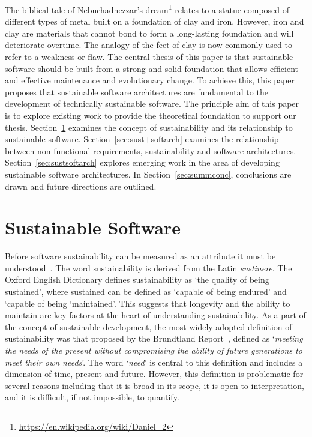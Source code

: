 \documentclass[preprint,12pt,authoryear]{elsarticle}
\begin{document}
The biblical tale of Nebuchadnezzar's
dream\footnote{\url{https://en.wikipedia.org/wiki/Daniel_2}} relates
to a statue composed of different types of metal built on a foundation
of clay and iron. However, iron and clay are materials that cannot
bond to form a long-lasting foundation and will deteriorate
overtime. The analogy of the feet of clay is now commonly used to
refer to a weakness or flaw. The central thesis of this paper is that
sustainable software should be built from a strong and solid
foundation that allows efficient and effective maintenance and
evolutionary change. To achieve this, this paper proposes that
sustainable software architectures are fundamental to the development
of technically sustainable software. The principle aim of this paper
is to explore existing work to provide the theoretical foundation to
support our thesis. Section~\ref{sec:sussoft} examines the concept of
sustainability and its relationship to sustainable
software. Section~\ref{sec:sust+softarch} examines the relationship
between non-functional requirements, sustainability and software
architectures. Section~\ref{sec:sustsoftarch} explores emerging work
in the area of developing sustainable software architectures. In
Section~\ref{sec:summconc}, conclusions are drawn and future
directions are outlined.


\section{Sustainable Software}\label{sec:sussoft}

Before software sustainability can be measured as an attribute it must
be understood~\citep{seacord-et-al:2003}. The word sustainability is
derived from the Latin {\emph{sustinere}}. The Oxford English
Dictionary defines sustainability as ‘the quality of being sustained’,
where sustained can be defined as ‘capable of being endured’ and
‘capable of being ‘maintained’. This suggests that longevity and the
ability to maintain are key factors at the heart of understanding
sustainability.  As a part of the concept of sustainable development,
the most widely adopted definition of sustainability was that proposed
by the Brundtland Report~\citep{brundtlandreport:1987}, defined as
`{\emph{meeting the needs of the present without compromising the
ability of future generations to meet their own needs}}'. The word
`{\emph{need}}' is central to this definition and includes a dimension
of time, present and future. However, this definition is problematic
for several reasons including that it is broad in its scope, it is
open to interpretation, and it is difficult, if not impossible, to
quantify.
\end{document}
